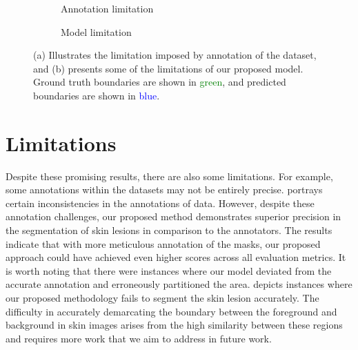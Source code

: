 \documentclass[runningheads]{llncs}
\begin{document}
\begin{figure*}[!t]
	\centering
	\begin{subfigure}{0.46\textwidth}
        
		\caption{Annotation limitation}
		\label{fig:annotation}
	\end{subfigure} \hfill
	\begin{subfigure}{0.46\textwidth}
        
		\caption{Model limitation}
		\label{fig:model limit}
	\end{subfigure}
        
	\caption{(a) Illustrates the limitation imposed by annotation of the dataset, and (b) presents some of the limitations of our proposed model. Ground truth boundaries are shown in \textcolor{green}{green}, and predicted boundaries are shown in \textcolor{blue}{blue}. }
 \label{fig:limitation}
\end{figure*}

\section{Limitations}


Despite these promising results, there are also some limitations. For example, some annotations within the datasets may not be entirely precise.  portrays certain inconsistencies in the annotations of data. However, despite these annotation challenges, our proposed method demonstrates superior precision in the segmentation of skin lesions in comparison to the annotators. The results indicate that with more meticulous annotation of the masks, our proposed approach could have achieved even higher scores across all evaluation metrics. It is worth noting that there were instances where our model deviated from the accurate annotation and erroneously partitioned the area.  depicts instances where our proposed methodology fails to segment the skin lesion accurately. The difficulty in accurately demarcating the boundary between the foreground and background in skin images arises from the high similarity between these regions and requires more work that we aim to address in future work.
\end{document}
